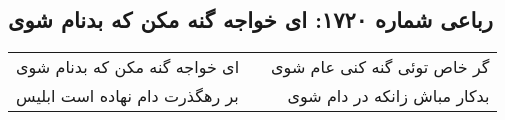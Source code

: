 \begin{center}
\section*{رباعی شماره ۱۷۲۰: ای خواجه گنه مکن که بدنام شوی}
\label{sec:1720}
\begin{longtable}{l p{0.5cm} r}
ای خواجه گنه مکن که بدنام شوی
&&
گر خاص توئی گنه کنی عام شوی
\\
بر رهگذرت دام نهاده است ابلیس
&&
بدکار مباش زانکه در دام شوی
\\
\end{longtable}
\end{center}
